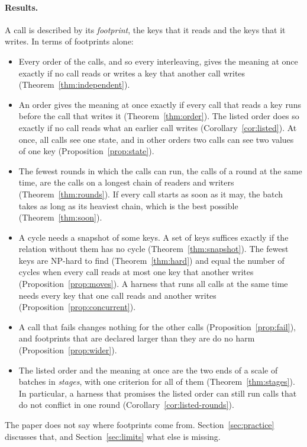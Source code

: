 \documentclass[acmsmall,nonacm,screen]{acmart}
\begin{document}
\paragraph{Results.} A call is described by its \emph{footprint}, the keys that it reads and
the keys that it writes. In terms of footprints alone:
\begin{itemize}
\item Every order of the calls, and so every interleaving, gives the meaning at once exactly
  if no call reads or writes a key that another call writes (Theorem~\ref{thm:independent}).
\item An order gives the meaning at once exactly if every call that reads a key runs before
  the call that writes it (Theorem~\ref{thm:order}). The listed order does so exactly if no
  call reads what an earlier call writes (Corollary~\ref{cor:listed}). At once, all calls
  see one state, and in other orders two calls can see two values of one key
  (Proposition~\ref{prop:state}).
\item The fewest rounds in which the calls can run, the calls of a round at the same time,
  are the calls on a longest chain of readers and writers (Theorem~\ref{thm:rounds}). If
  every call starts as soon as it may, the batch takes as long as its heaviest chain, which
  is the best possible (Theorem~\ref{thm:soon}).
\item A cycle needs a snapshot of some keys. A set of keys suffices exactly if the relation
  without them has no cycle (Theorem~\ref{thm:snapshot}). The fewest keys are NP-hard to
  find (Theorem~\ref{thm:hard}) and equal the number of cycles when every call reads at most
  one key that another writes (Proposition~\ref{prop:moves}). A harness that runs all calls
  at the same time needs every key that one call reads and another writes
  (Proposition~\ref{prop:concurrent}).
\item A call that fails changes nothing for the other calls (Proposition~\ref{prop:fail}),
  and footprints that are declared larger than they are do no harm
  (Proposition~\ref{prop:wider}).
\item The listed order and the meaning at once are the two ends of a scale of batches in
  \emph{stages}, with one criterion for all of them (Theorem~\ref{thm:stages}). In particular,
  a harness that promises the listed order can still run calls that do not conflict in one
  round (Corollary~\ref{cor:listed-rounds}).
\end{itemize}

The paper does not say where footprints come from. Section~\ref{sec:practice} discusses
that, and Section~\ref{sec:limits} what else is missing.
\end{document}
